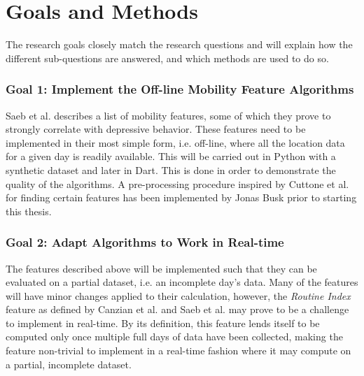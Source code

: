\section{Goals and Methods}


The research goals closely match the research questions and will explain how the different sub-questions are answered, and which methods are used to do so.

\subsubsection*{Goal 1: Implement the Off-line Mobility Feature Algorithms}
Saeb et al. \cite{Saeb2015} describes a list of mobility features, some of which they prove to strongly correlate with depressive behavior. These features need to be implemented in their most simple form, i.e. off-line, where all the location data for a given day is readily available. This will be carried out in Python with a synthetic dataset and later in Dart. This is done in order to demonstrate the quality of the algorithms. A pre-processing procedure inspired by Cuttone et al. \cite{sparse-location-2014} for finding certain features has been implemented by Jonas Busk prior to starting this thesis. 

\subsubsection*{Goal 2: Adapt Algorithms to Work in Real-time}
The features described above will be implemented such that they can be evaluated on a partial dataset, i.e. an incomplete day's data. Many of the features will have minor changes applied to their calculation, however, the \textit{Routine Index} feature as defined by Canzian et al.\cite{Canzian2015} and Saeb et al. \cite{Saeb2015} may prove to be a challenge to implement in real-time. By its definition, this feature lends itself to be computed only once multiple full days of data have been collected, making the feature non-trivial to implement in a real-time fashion where it may compute on a partial, incomplete dataset. 


